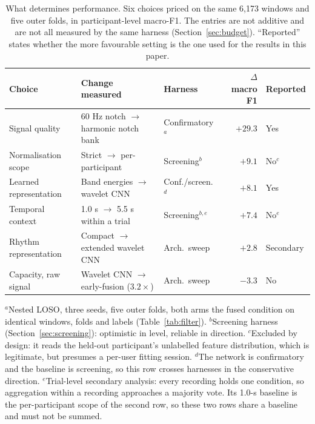 \documentclass[pdflatex,sn-nature,iicol]{sn-jnl}
\begin{document}
\begin{table}[t]
  \centering
  \caption{What determines performance. Six choices priced on the same 6,173 windows and five outer folds, in participant-level macro-F1. The entries are not additive and are not all measured by the same harness (Section~\ref{sec:budget}). ``Reported'' states whether the more favourable setting is the one used for the results in this paper.}
  \label{tab:budget}
  \footnotesize
  \begin{tabular*}{\textwidth}{@{\extracolsep{\fill}}lllrl@{}}
    \toprule
    Choice & Change measured & Harness & $\Delta$ macro F1 & Reported \\
    \midrule
    Signal quality & 60 Hz notch $\rightarrow$ harmonic notch bank & Confirmatory$^{a}$ & $+29.3$ & Yes \\
    Normalisation scope & Strict $\rightarrow$ per-participant & Screening$^{b}$ & $+9.1$ & No$^{c}$ \\
    Learned representation & Band energies $\rightarrow$ wavelet CNN & Conf./screen.$^{d}$ & $+8.1$ & Yes \\
    Temporal context & 1.0 s $\rightarrow$ 5.5 s within a trial & Screening$^{b,e}$ & $+7.4$ & No$^{e}$ \\
    Rhythm representation & Compact $\rightarrow$ extended wavelet CNN & Arch.\ sweep & $+2.8$ & Secondary \\
    Capacity, raw signal & Wavelet CNN $\rightarrow$ early-fusion ($3.2\times$) & Arch.\ sweep & $-3.3$ & No \\
    \bottomrule
  \end{tabular*}
  \begin{flushleft}\footnotesize
  $^{a}$Nested LOSO, three seeds, five outer folds, both arms the fused condition on identical windows, folds and labels (Table~\ref{tab:filter}).
  $^{b}$Screening harness (Section~\ref{sec:screening}): optimistic in level, reliable in direction.
  $^{c}$Excluded by design: it reads the held-out participant's unlabelled feature distribution, which is legitimate, but presumes a per-user fitting session.
  $^{d}$The network is confirmatory and the baseline is screening, so this row crosses harnesses in the conservative direction.
  $^{e}$Trial-level secondary analysis: every recording holds one condition, so aggregation within a recording approaches a majority vote. Its 1.0-s baseline is the per-participant scope of the second row, so these two rows share a baseline and must not be summed.
  \end{flushleft}
\end{table}
\end{document}
